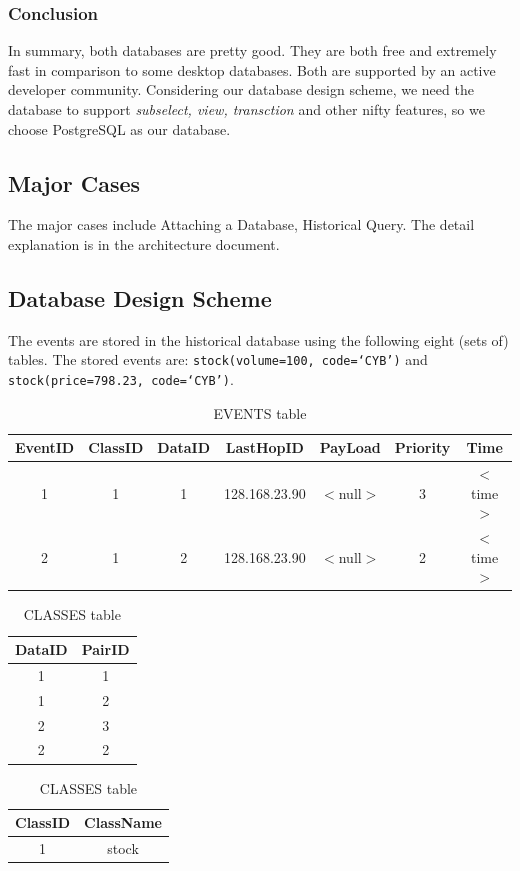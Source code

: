 \documentclass[11pt]{article}
\begin{document}
\subsubsection{Conclusion}
In summary, both databases are pretty good. They are both free and extremely fast in comparison to some desktop databases. Both are supported by an active developer community. Considering our database design scheme, we need the database to support \emph{subselect, view, transction} and other nifty features, so we choose PostgreSQL as our database.


\subsection{Major Cases}   %
The major cases include Attaching a Database, Historical Query. The detail explanation is in the architecture document.

\subsection{Database Design Scheme}  %
The events are stored in the historical database using the following eight (sets
of) tables. The stored events are: \texttt{stock(volume=100, code=`CYB')} and
\texttt{stock(price=798.23, code=`CYB')}.

\begin{table}[!h]					%
\centering
\begin{tabular}{c|c|c|c|c|c|c}
\textbf{EventID} & ClassID & DataID & LastHopID & PayLoad & Priority & Time \\
\hline
1 & 1 & 1 & 128.168.23.90 & $<$null$>$ & 3 & $<$time$>$ \\
2 & 1 & 2 & 128.168.23.90 & $<$null$>$ & 2 & $<$time$>$
\end{tabular}
\caption{EVENTS table}
\end{table}

\begin{table}[!h]					%
\begin{minipage}[!h]{0.5\linewidth}
\centering
\begin{tabular}{c|c}
\textbf{DataID} & \textbf{PairID} \\
\hline
1 & 1 \\
1 & 2 \\
2 & 3 \\
2 & 2
\end{tabular}
\caption{EVENTDATA table}
\end{minipage}
\begin{minipage}[!h]{0.5\linewidth}
\centering
\begin{tabular}{c|c}
\textbf{ClassID} & ClassName \\
\hline
1 & stock
\end{tabular}
\caption{CLASSES table}
\end{minipage}
\end{table}
\end{document}
